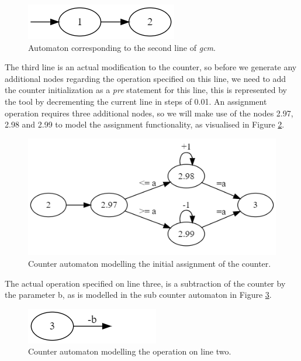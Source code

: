 \documentclass[12pt]{article}
\begin{document}
\begin{figure}[h]
	\centering
	\includegraphics[width=0.4\linewidth]{final_overview_2}
	\caption{Automaton corresponding to the second line of \textit{gcm}.}
	\label{fig:final_overview_2}
\end{figure}

\newpage

The third line is an actual modification to the counter, so before we generate any additional nodes regarding the operation specified on this line, we need to add the counter initialization as a \textit{pre} statement for this line, this is represented by the tool by decrementing the current line in steps of 0.01. An assignment operation requires three additional nodes, so we will make use of the nodes 2.97, 2.98 and 2.99 to model the assignment functionality, as visualised in Figure \ref{fig:final_overview_3}.

\begin{figure}[h]
	\centering
	\includegraphics[width=0.7\linewidth]{final_overview_3}
	\caption{Counter automaton modelling the initial assignment of the counter.}
	\label{fig:final_overview_3}
\end{figure}

The actual operation specified on line three, is a subtraction of the counter by the parameter b, as is modelled in the sub counter automaton in Figure \ref{fig:final_overview_4}.

\begin{figure}[h]
	\centering
	\includegraphics[width=0.35\linewidth]{final_overview_4}
	\caption{Counter automaton modelling the operation on line two.}
	\label{fig:final_overview_4}
\end{figure}
\end{document}
